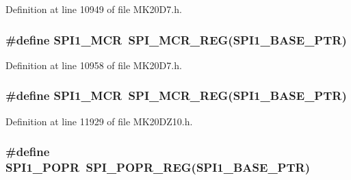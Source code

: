 Definition at line 10949 of file M\+K20\+D7.\+h.

\subsubsection[{\texorpdfstring{S\+P\+I1\+\_\+\+M\+CR}{SPI1_MCR}}]{\setlength{\rightskip}{0pt plus 5cm}\#define S\+P\+I1\+\_\+\+M\+CR~{\bf S\+P\+I\+\_\+\+M\+C\+R\+\_\+\+R\+EG}({\bf S\+P\+I1\+\_\+\+B\+A\+S\+E\+\_\+\+P\+TR})}\hypertarget{group___s_p_i___register___accessor___macros_gaa93e33ad75971c31b92babebf679fc5a}{}\label{group___s_p_i___register___accessor___macros_gaa93e33ad75971c31b92babebf679fc5a}


Definition at line 10958 of file M\+K20\+D7.\+h.

\subsubsection[{\texorpdfstring{S\+P\+I1\+\_\+\+M\+CR}{SPI1_MCR}}]{\setlength{\rightskip}{0pt plus 5cm}\#define S\+P\+I1\+\_\+\+M\+CR~{\bf S\+P\+I\+\_\+\+M\+C\+R\+\_\+\+R\+EG}({\bf S\+P\+I1\+\_\+\+B\+A\+S\+E\+\_\+\+P\+TR})}\hypertarget{group___s_p_i___register___accessor___macros_gaa93e33ad75971c31b92babebf679fc5a}{}\label{group___s_p_i___register___accessor___macros_gaa93e33ad75971c31b92babebf679fc5a}


Definition at line 11929 of file M\+K20\+D\+Z10.\+h.

\subsubsection[{\texorpdfstring{S\+P\+I1\+\_\+\+P\+O\+PR}{SPI1_POPR}}]{\setlength{\rightskip}{0pt plus 5cm}\#define S\+P\+I1\+\_\+\+P\+O\+PR~{\bf S\+P\+I\+\_\+\+P\+O\+P\+R\+\_\+\+R\+EG}({\bf S\+P\+I1\+\_\+\+B\+A\+S\+E\+\_\+\+P\+TR})}\hypertarget{group___s_p_i___register___accessor___macros_gaff7c8bb79325876a9887793aafe08e43}{}\label{group___s_p_i___register___accessor___macros_gaff7c8bb79325876a9887793aafe08e43}



